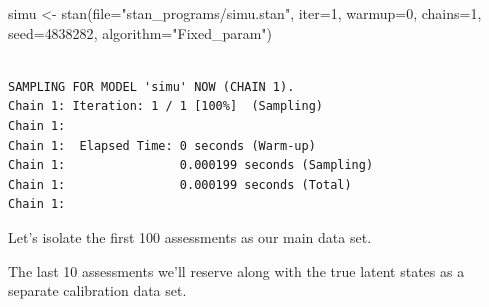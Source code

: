 \documentclass[
  letterpaper,
  DIV=11,
  numbers=noendperiod]{scrartcl}
\newenvironment{Shaded}{\begin{snugshade}}{\end{snugshade}}
\newcommand{\AttributeTok}[1]{\textcolor[rgb]{0.40,0.45,0.13}{#1}}
\newcommand{\DecValTok}[1]{\textcolor[rgb]{0.68,0.00,0.00}{#1}}
\newcommand{\FunctionTok}[1]{\textcolor[rgb]{0.28,0.35,0.67}{#1}}
\newcommand{\NormalTok}[1]{\textcolor[rgb]{0.00,0.23,0.31}{#1}}
\newcommand{\OtherTok}[1]{\textcolor[rgb]{0.00,0.23,0.31}{#1}}
\newcommand{\SpecialCharTok}[1]{\textcolor[rgb]{0.37,0.37,0.37}{#1}}
\newcommand{\StringTok}[1]{\textcolor[rgb]{0.13,0.47,0.30}{#1}}
\begin{document}
\begin{Shaded}
\begin{Highlighting}[]
\NormalTok{simu }\OtherTok{\textless{}{-}} \FunctionTok{stan}\NormalTok{(}\AttributeTok{file=}\StringTok{"stan\_programs/simu.stan"}\NormalTok{,}
             \AttributeTok{iter=}\DecValTok{1}\NormalTok{, }\AttributeTok{warmup=}\DecValTok{0}\NormalTok{, }\AttributeTok{chains=}\DecValTok{1}\NormalTok{,}
             \AttributeTok{seed=}\DecValTok{4838282}\NormalTok{, }\AttributeTok{algorithm=}\StringTok{"Fixed\_param"}\NormalTok{)}
\end{Highlighting}
\end{Shaded}

\begin{verbatim}

SAMPLING FOR MODEL 'simu' NOW (CHAIN 1).
Chain 1: Iteration: 1 / 1 [100%]  (Sampling)
Chain 1: 
Chain 1:  Elapsed Time: 0 seconds (Warm-up)
Chain 1:                0.000199 seconds (Sampling)
Chain 1:                0.000199 seconds (Total)
Chain 1: 
\end{verbatim}

Let's isolate the first 100 assessments as our main data set.

\begin{Shaded}
\end{Shaded}

The last 10 assessments we'll reserve along with the true latent states
as a separate calibration data set.
\end{document}
